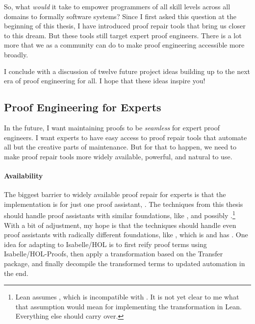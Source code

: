 

So, what \textit{would} it take to empower programmers of all skill levels across all domains to formally  software systems?
Since I first asked this question at the beginning of this thesis, I have introduced proof repair tools that bring us closer to this dream.
But these tools still target expert proof engineers.
There is a lot more that we as a community can do to make proof engineering accessible more broadly.

I conclude with a discussion of twelve future project ideas building up to the next era of proof engineering for all.
I hope that these ideas inspire you!

\subsection*{Proof Engineering for Experts}

In the future, I want maintaining proofs to be \emph{seamless} for expert proof engineers.
I want experts to have easy access to proof repair tools that automate all but the creative parts of maintenance.
But for that to happen, we need to make proof repair tools more widely available, powerful, and natural to use.

\paragraph{Availability}
The biggest barrier to widely available proof repair for experts is that the implementation is for just one proof assistant, .
The techniques from this thesis should handle proof assistants with similar foundations, like ,
and possibly .\footnote{Lean assumes , which is incompatible with .
It is not yet clear to me what that assumption would mean for implementing the \toolnamec transformation in Lean.
Everything else should carry over.}
With a bit of adjustment, my hope is that the techniques should handle even proof assistants with radically different foundations,
like , which is  and has .
One idea for adapting \toolnamec to Isabelle/HOL is to first reify proof terms using Isabelle/HOL-Proofs,
then apply a transformation based on the Transfer~\cite{Huffman2013} package, and finally decompile the transformed terms to updated automation in the end.

